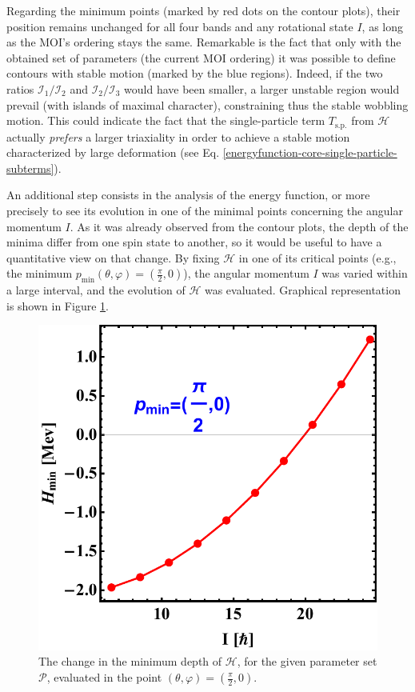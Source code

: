 \documentclass[11pt]{article}
\begin{document}
Regarding the minimum points (marked by red dots on the contour plots), their position remains unchanged for all four bands and any rotational state $I$, as long as the MOI's ordering stays the same. Remarkable is the fact that only with the obtained set of parameters (the current MOI ordering) it was possible to define contours with stable motion (marked by the blue regions). Indeed, if the two ratios $\mathcal{I}_1/\mathcal{I}_2$ and $\mathcal{I}_2/\mathcal{I}_3$ would have been smaller, a larger unstable region would prevail (with islands of maximal character), constraining thus the stable wobbling motion. This could indicate the fact that the single-particle term $T_\text{s.p.}$ from $\mathcal{H}$ actually \emph{prefers} a larger triaxiality in order to achieve a stable motion characterized by large deformation (see Eq. \ref{energyfunction-core-single-particle-subterms}).

An additional step consists in the analysis of the energy function, or more precisely to see its evolution in one of the minimal points concerning the angular momentum $I$. As it was already observed from the contour plots, the depth of the minima differ from one spin state to another, so it would be useful to have a quantitative view on that change. By fixing $\mathcal{H}$ in one of its critical points (e.g., the minimum $p_\text{min}(\theta,\varphi)=(\frac{\pi}{2},0)$), the angular momentum $I$ was varied within a large interval, and the evolution of $\mathcal{H}$ was evaluated. Graphical representation is shown in Figure \ref{energy-function-minimum-evolution}.

\begin{figure}
    \centering
    \includegraphics[scale=0.65]{figs/energy_function_minPoint_Evolution.pdf}
    \caption{The change in the minimum depth of $\mathcal{H}$, for the given parameter set $\mathcal{P}$, evaluated in the point $(\theta,\varphi)=(\frac{\pi}{2},0)$.}
    \label{energy-function-minimum-evolution}
\end{figure}
\end{document}
